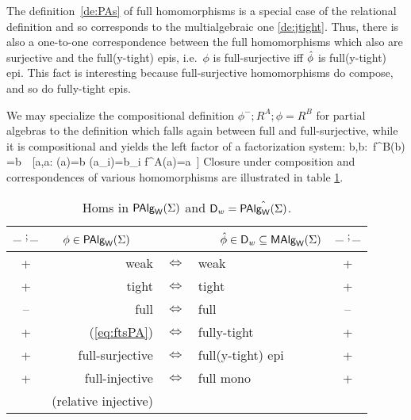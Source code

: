 \documentclass[10pt]{article}
\begin{document}
The definition~\ref{de:PAs} of full homomorphisms is a special case of the
relational definition and so corresponds to the multialgebraic one
\ref{de:jtight}.  Thus, there is also a one-to-one correspondence
between the full homomorphisms which also are surjective and the full(y-tight)
epis, i.e.\ $\phi$ is full-surjective iff $\hat{\phi}$ is full(y-tight)
epi.  This fact is interesting because full-surjective homomorphisms do
compose, and so do fully-tight epis.

We may specialize the compositional definition $\phi^-;R^A;\phi=R^B$
for partial algebras to the definition which falls again between full
and full-surjective, while it is compositional and yields the left
factor of a factorization system: 
\eq
{ \forall \lis b,b:\ f^B(\lis b) =b\ \Iff\ [\exists \lis a,a:
\phi(a)=b \land \phi(a_i)=b_i \land f^A(\lis a)=a\ ]
\label{eq:ftsPA}
}
Closure under composition and correspondences of various homomorphisms are
illustrated in table \ref{ta:homs}.

\begin{table}[hbt]
\begin{center}
\begin{tabular}{cr|c|lc}
$\Comp{\_\ }\_$ & $\phi\in\mbox{\rm\sf PAlg}_{\sf W}(\Sigma)$\ \ \  & 
 & \ \ \ $\hat{\phi}\in\mbox{\rm\sf D}_w\subseteq\mbox{\rm\sf MAlg}_{\sf W}(\Sigma)$ & $\Comp{\_\ }\_$ \\ \hline
+ & weak & $\iff$ & weak & + \\
+ & tight & $\iff$  & tight & +\\
-- & full & $\iff$ & full  & -- \\
+ & (\ref{eq:ftsPA}) & $\iff$ & fully-tight & + \\
+ & full-surjective & $\iff$ & full(y-tight) epi  & +\\
+& full-injective & $\iff$ & full  mono &  + \\
& (relative injective) 
\end{tabular}
\end{center}
\caption{Homs in $\mbox{\rm\sf PAlg}_{\sf W}(\Sigma)$ and $\mbox{\rm\sf D}_w=\hat{\mbox{\rm\sf PAlg}_{\sf W}(\Sigma)}$.}\label{ta:homs}
\end{table}

\end{document}
